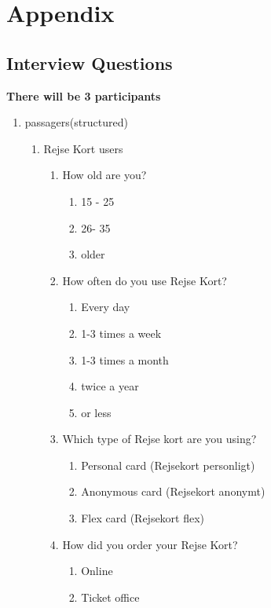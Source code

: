 \section*{Appendix}

\subsection*{Interview Questions}

\textbf{There will be 3 participants} 
\begin{enumerate} %
	\item passagers(structured)
		\begin{enumerate} %
			\item Rejse Kort users
				\begin{enumerate}
					\item How old are you? 
					\begin{enumerate}Range:
						\item 15 - 25
						\item 26- 35
						\item older
				\end{enumerate}
				
			\item How often do you use Rejse Kort?
				\begin{enumerate}
					\item Every day
					\item 1-3 times a week
					\item 1-3 times a month
					\item twice a year
					\item or less
				\end{enumerate}
				
			\item Which type of Rejse kort are you using?
				\begin{enumerate}
					\item Personal card (Rejsekort personligt)
					\item Anonymous card (Rejsekort anonymt)
					\item Flex card (Rejsekort flex)
				\end{enumerate}
				
			\item How did you order your Rejse Kort?
				\begin{enumerate}
					\item Online
					\item Ticket office
				\end{enumerate}
				

\end{enumerate}
\end{enumerate}
\end{enumerate}
